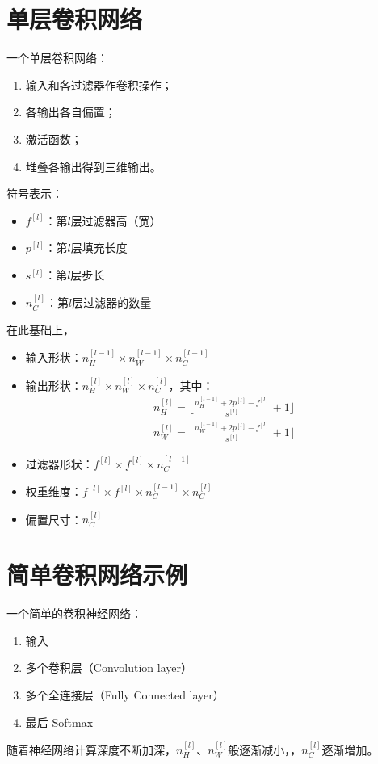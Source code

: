 \documentclass[../../main.tex]{subfiles}
\begin{document}
\section{单层卷积网络}
一个单层卷积网络：
\begin{enumerate}
    \item 输入和各过滤器作卷积操作；
    \item 各输出各自偏置；
    \item 激活函数；
    \item 堆叠各输出得到三维输出。
\end{enumerate}
符号表示：
\begin{itemize}
    \item \(f^{[l]}\)：第\(l\)层过滤器高（宽）
    \item \(p^{[l]}\)：第\(l\)层填充长度
    \item \(s^{[l]}\)：第\(l\)层步长
    \item \(n^{[l]}_C\)：第\(l\)层过滤器的数量
\end{itemize}
在此基础上，
\begin{itemize}
    \item 输入形状：\(n_H^{[l-1]} × n_W^{[l-1]} × n_C^{[l-1]}\)
    \item 输出形状：\(n_H^{[l]} × n_W^{[l]} × n_C^{[l]}\)，其中：
    \begin{align*}
         & n^{[l]}_H = \biggl\lfloor \frac{n^{[l-1]}_H+2p^{[l]}-f^{[l]}}{s^{[l]}}+1   \biggr\rfloor \\
         & n^{[l]}_W = \biggl\lfloor \frac{n^{[l-1]}_W+2p^{[l]}-f^{[l]}}{s^{[l]}}+1   \biggr\rfloor
    \end{align*}
    \item 过滤器形状：\(f^{[l]} × f^{[l]} × n_C^{[l-1]}\)
    \item 权重维度：\(f^{[l]} × f^{[l]} × n_C^{[l-1]} × n_C^{[l]}\)
    \item 偏置尺寸：\(n_C^{[l]}\)
\end{itemize}

\section{简单卷积网络示例}
一个简单的卷积神经网络：
\begin{enumerate}
    \item 输入
    \item 多个卷积层（Convolution layer）
    \item 多个全连接层（Fully Connected layer）
    \item 最后 Softmax
\end{enumerate}
随着神经网络计算深度不断加深，\(n_H^{[l]}\)、\( n_W^{[l]}\)般逐渐减小，，\(n_C^{[l]}\)逐渐增加。
\end{document}
